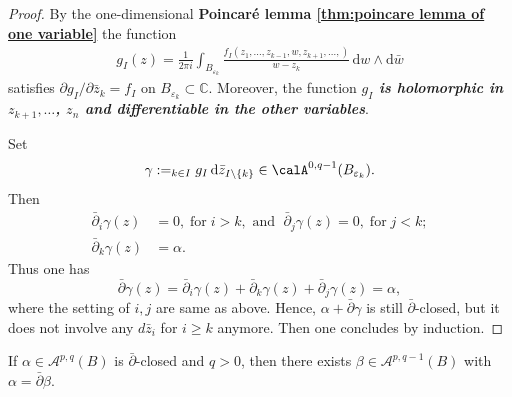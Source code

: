 \begin{proof}
By the one-dimensional \textbf{Poincaré lemma \ref{thm:poincare lemma of one variable}}  the function
\begin{align*}
g_I(z)=\frac{1}{2 \pi i} \int_{B_{\varepsilon_k}} \frac{f_I\left(z_1, \ldots, z_{k-1}, w, z_{k+1}, \ldots,\right)}{w-z_k} \,\mathrm{d}w \wedge \mathrm{d}\bar{w}
\end{align*}
satisfies $\partial g_I/\partial \bar{z}_k=f_I$ on $B_{\varepsilon_k} \subset \mathbb{C}$. Moreover, the function \textcolor[rgb]{0.75,0.16,0.44}{\textit{\textbf{$g_I$ is holomorphic in $z_{k+1}, \ldots$, $ z_n$ and differentiable in the other variables}}}.

Set {\color{DarkBlue}\[\gamma:=\sum_{k \in I} g_I \,\mathrm{d}\bar{z}_{I \backslash\{k\}}\in \calA^{0,q-1}(B_{\varepsilon_k}).\]}
 Then 
 {\color[rgb]{0.75,0.16,0.44}
 \begin{align*}
\bar{\partial}_i \gamma(z)&=0,\;\text{for}\; i>k, \text{ and } \; \bar{\partial}_j \gamma(z)=0, \;\text{for} \; j<k;\\ 
\bar{\partial}_k \gamma(z) &=\alpha.
 \end{align*}}
  Thus one has 
  \[
  \bar{\partial} \gamma(z)=\bar{\partial}_i \gamma(z)+\bar{\partial}_k \gamma(z)+\bar{\partial}_j \gamma(z)= \alpha,
  \]
  where the setting of $i,j$ are same as above. Hence, $\alpha+\bar{\partial} \gamma$ is still $\bar{\partial}$-closed, but it does not involve any $d \bar{z}_i$ for $i \geq k$ anymore. Then one concludes by induction.
\end{proof}

\begin{corollary}
  If $\alpha \in \mathcal{A}^{p, q}(B)$ is $\bar{\partial}$-closed and $q>0$, then there exists $\beta \in \mathcal{A}^{p, q-1}(B)$ with $\alpha=\bar{\partial} \beta$.
\end{corollary}


